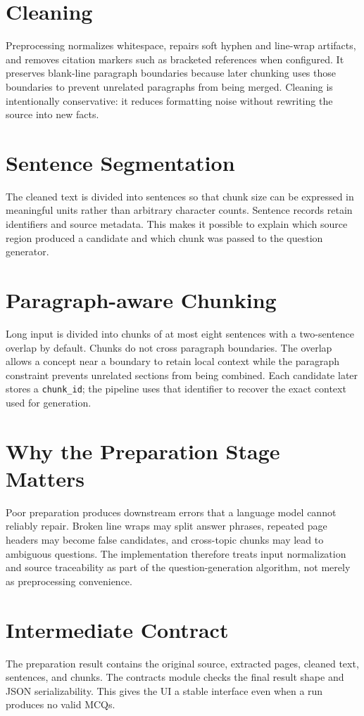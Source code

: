 \documentclass[12pt,a4paper]{report}
\newcommand{\code}[1]{\texttt{#1}}
\begin{document}
\section{Cleaning}
Preprocessing normalizes whitespace, repairs soft hyphen and line-wrap artifacts, and removes citation markers such as bracketed references when configured. It preserves blank-line paragraph boundaries because later chunking uses those boundaries to prevent unrelated paragraphs from being merged. Cleaning is intentionally conservative: it reduces formatting noise without rewriting the source into new facts.

\section{Sentence Segmentation}
The cleaned text is divided into sentences so that chunk size can be expressed in meaningful units rather than arbitrary character counts. Sentence records retain identifiers and source metadata. This makes it possible to explain which source region produced a candidate and which chunk was passed to the question generator.

\section{Paragraph-aware Chunking}
Long input is divided into chunks of at most eight sentences with a two-sentence overlap by default. Chunks do not cross paragraph boundaries. The overlap allows a concept near a boundary to retain local context while the paragraph constraint prevents unrelated sections from being combined. Each candidate later stores a \code{chunk\_id}; the pipeline uses that identifier to recover the exact context used for generation.

\section{Why the Preparation Stage Matters}
Poor preparation produces downstream errors that a language model cannot reliably repair. Broken line wraps may split answer phrases, repeated page headers may become false candidates, and cross-topic chunks may lead to ambiguous questions. The implementation therefore treats input normalization and source traceability as part of the question-generation algorithm, not merely as preprocessing convenience.

\section{Intermediate Contract}
The preparation result contains the original source, extracted pages, cleaned text, sentences, and chunks. The contracts module checks the final result shape and JSON serializability. This gives the UI a stable interface even when a run produces no valid MCQs.
\end{document}
